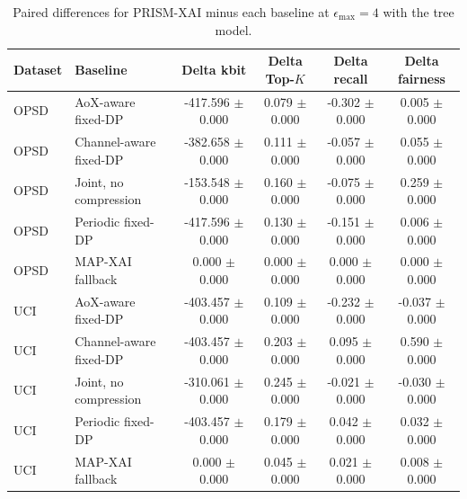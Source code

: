 \begin{table}[t]
\caption{Paired differences for PRISM-XAI minus each baseline at $\epsilon_{\max}=4$ with the tree model.}
\label{tab:paired-differences}
\centering
\scriptsize
\setlength{\tabcolsep}{3pt}
\begin{tabular}{llcccc}
\toprule
Dataset & Baseline & Delta kbit & Delta Top-$K$ & Delta recall & Delta fairness \\
\midrule
OPSD & AoX-aware fixed-DP & -417.596 $\pm$ 0.000 & 0.079 $\pm$ 0.000 & -0.302 $\pm$ 0.000 & 0.005 $\pm$ 0.000 \\
OPSD & Channel-aware fixed-DP & -382.658 $\pm$ 0.000 & 0.111 $\pm$ 0.000 & -0.057 $\pm$ 0.000 & 0.055 $\pm$ 0.000 \\
OPSD & Joint, no compression & -153.548 $\pm$ 0.000 & 0.160 $\pm$ 0.000 & -0.075 $\pm$ 0.000 & 0.259 $\pm$ 0.000 \\
OPSD & Periodic fixed-DP & -417.596 $\pm$ 0.000 & 0.130 $\pm$ 0.000 & -0.151 $\pm$ 0.000 & 0.006 $\pm$ 0.000 \\
OPSD & MAP-XAI fallback & 0.000 $\pm$ 0.000 & 0.000 $\pm$ 0.000 & 0.000 $\pm$ 0.000 & 0.000 $\pm$ 0.000 \\
UCI & AoX-aware fixed-DP & -403.457 $\pm$ 0.000 & 0.109 $\pm$ 0.000 & -0.232 $\pm$ 0.000 & -0.037 $\pm$ 0.000 \\
UCI & Channel-aware fixed-DP & -403.457 $\pm$ 0.000 & 0.203 $\pm$ 0.000 & 0.095 $\pm$ 0.000 & 0.590 $\pm$ 0.000 \\
UCI & Joint, no compression & -310.061 $\pm$ 0.000 & 0.245 $\pm$ 0.000 & -0.021 $\pm$ 0.000 & -0.030 $\pm$ 0.000 \\
UCI & Periodic fixed-DP & -403.457 $\pm$ 0.000 & 0.179 $\pm$ 0.000 & 0.042 $\pm$ 0.000 & 0.032 $\pm$ 0.000 \\
UCI & MAP-XAI fallback & 0.000 $\pm$ 0.000 & 0.045 $\pm$ 0.000 & 0.021 $\pm$ 0.000 & 0.008 $\pm$ 0.000 \\
\bottomrule
\end{tabular}
\end{table}
